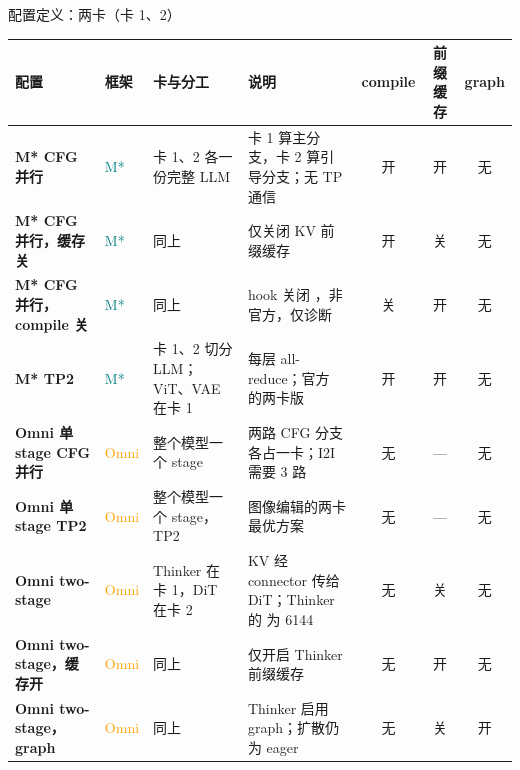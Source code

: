 \begin{frame}[t]{配置定义：两卡（卡 1、2）}
\scriptsize\def\codesize{\relax}
\renewcommand{\arraystretch}{1.1}\setlength{\tabcolsep}{2.5pt}
\begin{tabularx}{\textwidth}{>{\bfseries}p{3.2cm} p{1.0cm} p{3.4cm} Y c c c}
\toprule
{}
配置 & 框架 & 卡与分工 & 说明 & compile & 前缀缓存 & graph \\
\midrule
M* CFG 并行 & \textcolor{Teal}{M*} & 卡 1、2 各一份完整 LLM & 卡 1 算主分支，卡 2 算引导分支；无 TP 通信 & 开 & 开 & 无 \\
M* CFG 并行，缓存关 & \textcolor{Teal}{M*} & 同上 & 仅关闭 KV 前缀缓存 & 开 & 关 & 无 \\
M* CFG 并行，compile 关 & \textcolor{Teal}{M*} & 同上 & hook 关闭 ，非官方，仅诊断 & 关 & 开 & 无 \\
M* TP2 & \textcolor{Teal}{M*} & 卡 1、2 切分 LLM；ViT、VAE 在卡 1 & 每层 all-reduce；官方  的两卡版 & 开 & 开 & 无 \\
Omni 单 stage CFG 并行 & \textcolor{Orange}{Omni} & 整个模型一个 stage & 两路 CFG 分支各占一卡；I2I 需要 3 路 & 无 & — & 无 \\
Omni 单 stage TP2 & \textcolor{Orange}{Omni} & 整个模型一个 stage，TP2 & 图像编辑的两卡最优方案 & 无 & — & 无 \\
Omni two-stage & \textcolor{Orange}{Omni} & Thinker 在卡 1，DiT 在卡 2 & KV 经 connector 传给 DiT；Thinker 的  为 6144 & 无 & 关 & 无 \\
Omni two-stage，缓存开 & \textcolor{Orange}{Omni} & 同上 & 仅开启 Thinker 前缀缓存 & 无 & 开 & 无 \\
Omni two-stage，graph & \textcolor{Orange}{Omni} & 同上 & Thinker 启用 graph；扩散仍为 eager & 无 & 关 & 开 \\
\bottomrule
\end{tabularx}
\vspace{3pt}
\end{frame}


